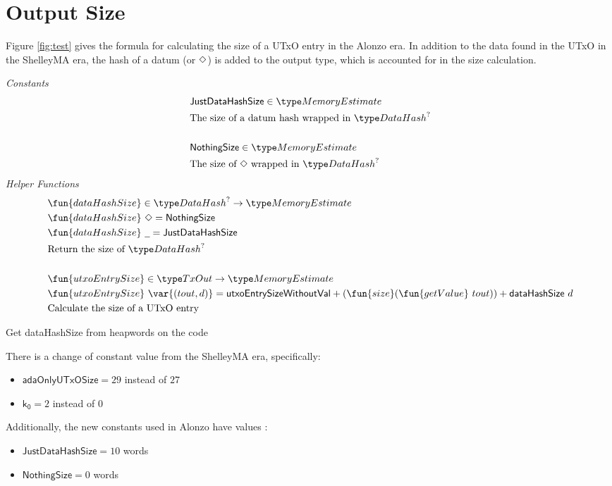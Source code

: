 \section{Output Size}
\label{sec:value-size}

Figure \ref{fig:test} gives the formula for calculating the size of a UTxO entry
in the Alonzo era. In addition to the data found in the UTxO in the ShelleyMA
era, the hash of a datum (or $\Diamond$) is added to the output type, which
is accounted for in the size calculation.

\begin{figure*}[h]
  \emph{Constants}
  \begin{align*}
  & \mathsf{JustDataHashSize} \in \MemoryEstimate \\
  & \text{The size of a datum hash wrapped in $\DataHash^?$} \\~
  \\
  & \mathsf{NothingSize} \in \MemoryEstimate \\
  & \text{The size of $\Nothing$ wrapped in $\DataHash^?$}
  \end{align*}
  \emph{Helper Functions}
  \begin{align*}
    & \fun{dataHashSize} \in \DataHash^? \to \MemoryEstimate \\
    & \fun{dataHashSize}~ \Nothing = \mathsf{NothingSize} \\
    & \fun{dataHashSize}~ \wcard = \mathsf{JustDataHashSize} \\
    & \text{Return the size of $\DataHash^?$} \\~\\
    & \fun{utxoEntrySize} \in \TxOut \to \MemoryEstimate \\
    & \fun{utxoEntrySize}~\var{(tout, d)} = \mathsf{utxoEntrySizeWithoutVal} + (\fun{size} (\fun{getValue}~tout)) + \mathsf{dataHashSize}~d \\
    & \text{Calculate the size of a UTxO entry}
  \end{align*}
  \caption{Value Size}
  \label{fig:test}
\end{figure*}

\begin{note}
  Get dataHashSize from heapwords on the code
\end{note}

There is a change of constant value from the ShelleyMA era, specifically:

\begin{itemize}
  \item $\mathsf{adaOnlyUTxOSize} = 29$ instead of $27$
  \item $\mathsf{k_0} = 2$ instead of $0$
\end{itemize}

Additionally, the new constants used in Alonzo have values :

\begin{itemize}
  \item $\mathsf{JustDataHashSize} = 10$ words
  \item $\mathsf{NothingSize} = 0$ words
\end{itemize}
